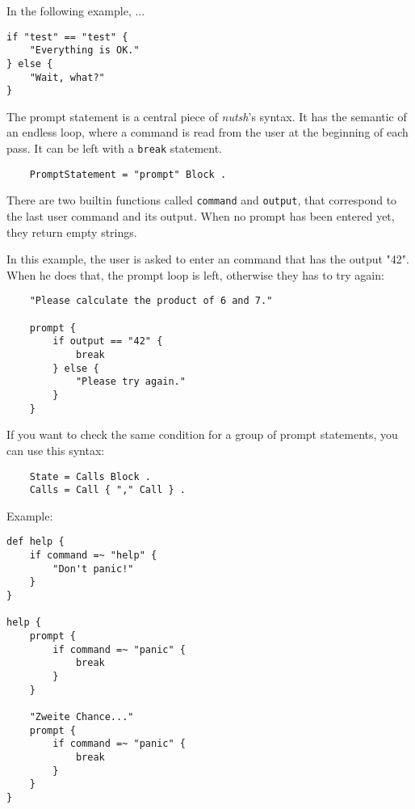 \documentclass[a4paper,twoside,abstract=on,cleardoublepage=empty,numbers=noenddot,toc=bib]{scrreprt}
\begin{document}
In the following example, ...

\begin{lstlisting}
if "test" == "test" {
    "Everything is OK."
} else {
    "Wait, what?"
}
\end{lstlisting}


The prompt statement is a central piece of \emph{nutsh}'s syntax. It has the semantic of an endless loop, where a command is read from the user at the beginning of each pass. It can be left with a \texttt{break} statement.

\begin{lstlisting}
    PromptStatement = "prompt" Block .
\end{lstlisting}

There are two builtin functions called \texttt{command} and \texttt{output}, that correspond to the last user command and its output. When no prompt has been entered yet, they return empty strings.

In this example, the user is asked to enter an command that has the output "42". When he does that, the prompt loop is left, otherwise they has to try again:

\begin{lstlisting}
    "Please calculate the product of 6 and 7."

    prompt {
        if output == "42" {
            break
        } else {
            "Please try again."
        }
    }
\end{lstlisting}


If you want to check the same condition for a group of prompt statements, you can use this syntax:

\begin{lstlisting}
    State = Calls Block .
    Calls = Call { "," Call } .
\end{lstlisting}

Example:

\begin{lstlisting}
def help {
    if command =~ "help" {
        "Don't panic!"
    }
}

help {
    prompt {
        if command =~ "panic" {
            break
        }
    }

    "Zweite Chance..."
    prompt {
        if command =~ "panic" {
            break
        }
    }
}
\end{lstlisting}
\end{document}

